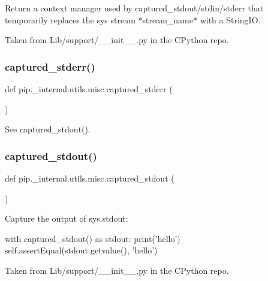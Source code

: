 \begin{DoxyVerb}Return a context manager used by captured_stdout/stdin/stderr
that temporarily replaces the sys stream *stream_name* with a StringIO.

Taken from Lib/support/__init__.py in the CPython repo.
\end{DoxyVerb}
 \mbox{\label{namespacepip_1_1__internal_1_1utils_1_1misc_a83f5a831d098f26759567f070646ef49}} 
\subsubsection{\texorpdfstring{captured\+\_\+stderr()}{captured\_stderr()}}
{\footnotesize\ttfamily def pip.\+\_\+internal.\+utils.\+misc.\+captured\+\_\+stderr (\begin{DoxyParamCaption}{ }\end{DoxyParamCaption})}

\begin{DoxyVerb}See captured_stdout().
\end{DoxyVerb}
 \mbox{\label{namespacepip_1_1__internal_1_1utils_1_1misc_ac1d3d1a40555a46ed9f931208d3cbdc9}} 
\subsubsection{\texorpdfstring{captured\+\_\+stdout()}{captured\_stdout()}}
{\footnotesize\ttfamily def pip.\+\_\+internal.\+utils.\+misc.\+captured\+\_\+stdout (\begin{DoxyParamCaption}{ }\end{DoxyParamCaption})}

\begin{DoxyVerb}Capture the output of sys.stdout:

   with captured_stdout() as stdout:
       print('hello')
   self.assertEqual(stdout.getvalue(), 'hello\n')

Taken from Lib/support/__init__.py in the CPython repo.
\end{DoxyVerb}
 \mbox{\label{namespacepip_1_1__internal_1_1utils_1_1misc_a2c56db5ea4bfcb80d54a94f1eb975454}} 
